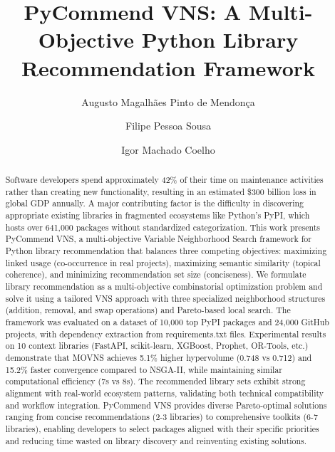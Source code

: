 \documentclass[runningheads]{llncs}
\begin{document}
\title{PyCommend VNS: A Multi-Objective Python Library Recommendation Framework}


\author{Augusto Magalhães Pinto de Mendonça \and
Filipe Pessoa Sousa \and
Igor Machado Coelho}



\maketitle

\begin{abstract}
Software developers spend approximately 42\% of their time on maintenance activities rather than creating new functionality, resulting in an estimated \$300 billion loss in global GDP annually. A major contributing factor is the difficulty in discovering appropriate existing libraries in fragmented ecosystems like Python's PyPI, which hosts over 641,000 packages without standardized categorization. This work presents PyCommend VNS, a multi-objective Variable Neighborhood Search framework for Python library recommendation that balances three competing objectives: maximizing linked usage (co-occurrence in real projects), maximizing semantic similarity (topical coherence), and minimizing recommendation set size (conciseness). We formulate library recommendation as a multi-objective combinatorial optimization problem and solve it using a tailored VNS approach with three specialized neighborhood structures (addition, removal, and swap operations) and Pareto-based local search. The framework was evaluated on a dataset of 10,000 top PyPI packages and 24,000 GitHub projects, with dependency extraction from requirements.txt files. Experimental results on 10 context libraries (FastAPI, scikit-learn, XGBoost, Prophet, OR-Tools, etc.) demonstrate that MOVNS achieves 5.1\% higher hypervolume (0.748 vs 0.712) and 15.2\% faster convergence compared to NSGA-II, while maintaining similar computational efficiency (7s vs 8s). The recommended library sets exhibit strong alignment with real-world ecosystem patterns, validating both technical compatibility and workflow integration. PyCommend VNS provides diverse Pareto-optimal solutions ranging from concise recommendations (2-3 libraries) to comprehensive toolkits (6-7 libraries), enabling developers to select packages aligned with their specific priorities and reducing time wasted on library discovery and reinventing existing solutions.

\end{abstract}
\end{document}
